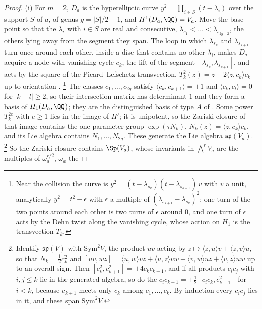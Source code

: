 \begin{proof}
(i) For $m=2$, $D_{a}$ is the hyperelliptic curve
$y^{2}=\prod_{i\in S}(t-\lambda_{i})$ over the support $S$ of $a$, of genus
$g=|S|/2-1$, and $H^{1}(D_{a},\QQ)=V_{a}$. Move the base point so that the
$\lambda_{i}$ with $i\in S$ are real and consecutive, $\lambda_{s_{1}}<\dots<
\lambda_{s_{2g+2}}$, the others lying away from the segment they span. The
loop in which $\lambda_{s_{k}}$ and $\lambda_{s_{k+1}}$ turn once around each
other, inside a disc that contains no other $\lambda_{i}$, makes $D_{a}$
acquire a node with vanishing cycle $c_{k}$, the lift of the segment
$[\lambda_{s_{k}},\lambda_{s_{k+1}}]$, and acts by the square of the
Picard--Lefschetz transvection,
$T_{k}^{2}(z)=z+2\langle z,c_{k}\rangle c_{k}$ up to orientation
\cite[Chapter~3]{Voi03}.%
\footnote{Near the collision the curve is $y^{2}=(t-\lambda_{s_{k}})
(t-\lambda_{s_{k+1}})\,v$ with $v$ a unit, analytically $y^{2}=t^{2}-\epsilon$
with $\epsilon$ a multiple of $(\lambda_{s_{k+1}}-\lambda_{s_{k}})^{2}$; one
turn of the two points around each other is two turns of $\epsilon$ around
$0$, and one turn
of $\epsilon$ acts by the Dehn twist along the vanishing cycle, whose action on
$H_{1}$ is the transvection $T_{k}$.} The classes $c_{1},\dots,c_{2g}$ satisfy
$\langle c_{k},c_{k+1}\rangle=\pm1$ and $\langle c_{k},c_{l}\rangle=0$ for
$|k-l|\ge2$, so their intersection matrix has determinant $1$ and they form a
basis of $H_{1}(D_{a},\QQ)$; they are the distinguished basis of type $A$ of
\cite{ACa79}. Some power $T_{k}^{2e}$ with $e\ge1$ lies in the image of
$\Pi'$; it is unipotent, so the Zariski closure of that image contains the
one-parameter group $\exp(\tau N_{k})$, $N_{k}(z)=\langle z,c_{k}\rangle c_{k}$,
and its Lie algebra contains $N_{1},\dots,N_{2g}$. These generate the Lie
algebra $\mathfrak{sp}(V_{a})$.%
\footnote{Identify $\mathfrak{sp}(V)$ with $\mathrm{Sym}^{2}V$, the product $uv$
acting by $z\mapsto\langle z,u\rangle v+\langle z,v\rangle u$, so that
$N_{k}=\tfrac12c_{k}^{2}$ and
$[uv,wz]=\langle u,w\rangle vz+\langle u,z\rangle vw+\langle v,w\rangle uz
+\langle v,z\rangle uw$ up to an overall sign. Then
$[c_{k}^{2},c_{k+1}^{2}]=\pm4c_{k}c_{k+1}$, and if all products
$c_{i}c_{j}$ with $i,j\le k$ lie in the generated algebra, so do the
$c_{i}c_{k+1}=\pm\tfrac12[c_{i}c_{k},c_{k+1}^{2}]$ for $i<k$, because
$c_{k+1}$ meets only $c_{k}$ among $c_{1},\dots,c_{k}$. By induction every
$c_{i}c_{j}$ lies in it, and these span $\mathrm{Sym}^{2}V$.} So the Zariski
closure contains $\Sp(V_{a})$, whose invariants in
$\bigwedge^{r}V_{a}$ are the multiples of $\omega_{a}^{r/2}$, $\omega_{a}$ the

\end{proof}
